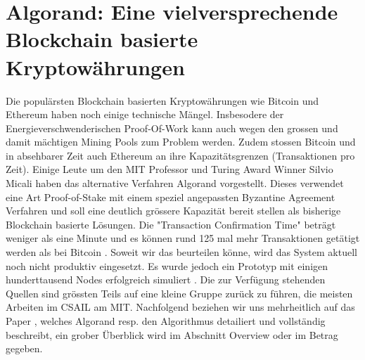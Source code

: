 \documentclass[11pt,a4paper]{article}
\author{Heinz Hofmann und Jonas Schmid}
\begin{document}
\section*{ \center \textbf{\Large Algorand: Eine vielversprechende Blockchain basierte Kryptow\"ahrungen}}

Die popul\"arsten Blockchain basierten Kryptow\"ahrungen wie Bitcoin und Ethereum haben noch einige technische M\"angel.
Insbesodere der Energieverschwenderischen Proof-Of-Work kann auch wegen den grossen 
und damit m\"achtigen Mining Pools zum Problem werden.
Zudem stossen Bitcoin und in absehbarer Zeit auch Ethereum an ihre Kapazit\"atsgrenzen (Transaktionen pro Zeit).
Einige Leute um den MIT Professor und Turing Award Winner Silvio Micali haben das alternative Verfahren Algorand vorgestellt.
Dieses verwendet eine Art Proof-of-Stake mit einem speziel angepassten Byzantine Agreement Verfahren und soll eine deutlich gr\"ossere Kapazit\"at bereit stellen als bisherige Blockchain basierte L\"osungen.
Die "Transaction Confirmation Time" betr\"agt weniger als eine Minute und es k\"onnen rund 125 mal mehr Transaktionen get\"atigt werden als bei Bitcoin \cite[Introduction]{Gilad:2017:ASB:3132747.3132757}.
Soweit wir das beurteilen k\"onne, wird das System aktuell noch nicht produktiv eingesetzt.
Es wurde jedoch ein Prototyp mit einigen hunderttausend Nodes erfolgreich simuliert \cite[Kapitel Implementation \& Evaluation]{Gilad:2017:ASB:3132747.3132757}.
Die zur Verf\"ugung stehenden Quellen sind gr\"ossten Teils auf eine kleine Gruppe zur\"uck zu f\"uhren,
die meisten Arbeiten im CSAIL am MIT. %
Nachfolgend beziehen wir uns mehrheitlich auf das Paper \cite{Gilad:2017:ASB:3132747.3132757}, welches Algorand resp. den Algorithmus detailiert und vollst\"andig beschreibt, ein grober \"Uberblick wird im Abschnitt Overview oder im Betrag \cite{ScalingConsensus} gegeben.
\end{document}
